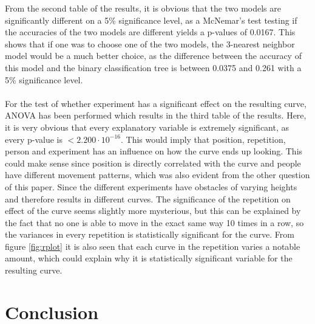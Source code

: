 \documentclass[11pt, fleqn, titlepage]{article}
\begin{document}
From the second table of the results, it is obvious that the two models are significantly different on a 5\% significance level, as a McNemar's test testing if the accuracies of the two models are different yields a p-values of 0.0167. This shows that if one was to choose one of the two models, the 3-nearest neighbor model would be a much better choice, as the difference between the accuracy of this model and the binary classification tree is between 0.0375 and 0.261 with a 5\% significance level. 
\\\\
For the test of whether experiment has a significant effect on the resulting curve, ANOVA has been performed which results in the third table of the results. Here, it is very obvious that every explanatory variable is extremely significant, as every p-value is $<2.200 \cdot 10^{-16}$. This would imply that position, repetition, person and experiment has an influence on how the curve ends up looking. This could make sense since position is directly correlated with the curve and people have different movement patterns, which was also evident from the other question of this paper. Since the different experiments have obstacles of varying heights and therefore results in different curves. The significance of the repetition on effect of the curve seems slightly more mysterious, but this can be explained by the fact that no one is able to move in the exact same way 10 times in a row, so the variances in every repetition is statistically significant for the curve. From figure \ref{fig:rplot} it is also seen that each curve in the repetition varies a notable amount, which could explain why it is statistically significant variable for the resulting curve. 

\section{Conclusion}
\end{document}
